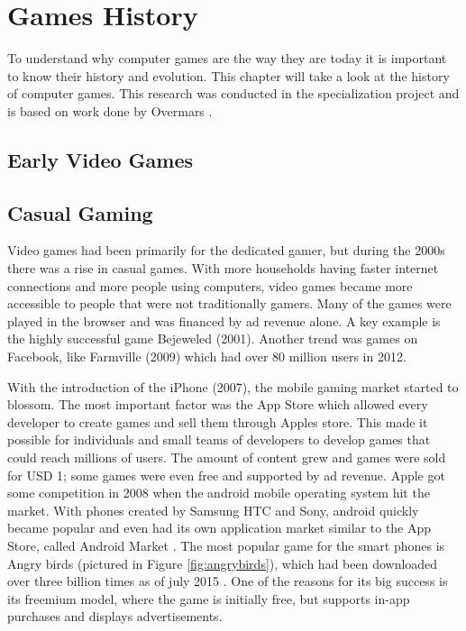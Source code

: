 \chapter{Games History}
\label{ch:gameshistory}
To understand why computer games are the way they are today it is important to know their history and evolution. This chapter will take a look at the history of computer games.
This research was conducted in the specialization project and is based on work done by Overmars \cite{overmars2012}.




\section{Early Video Games}

\section{Casual Gaming}
\label{sec:casualgaming}
Video games had been primarily for the dedicated gamer, but during the 2000s there was a rise in casual games. With more households having faster internet connections and more people using computers, video games became more accessible to people that were not traditionally gamers. Many of the games were played in the browser and was financed by ad revenue alone. A key example is the highly successful game Bejeweled (2001). Another trend was games on Facebook, like Farmville (2009) which had over 80 million users in 2012.

With the introduction of the iPhone (2007), the mobile gaming market started to blossom. The most important factor was the App Store which allowed every developer to create games and sell them through Apples store. This made it possible for individuals and small teams of developers to develop games that could reach millions of users. The amount of content grew and games were sold for USD 1; some games were even free and supported by ad revenue. Apple got some competition in 2008 when the android mobile operating system hit the market. With phones created by Samsung HTC and Sony, android quickly became popular and even had its own application market similar to the App Store, called Android Market \cite{2015android}. The most popular game for the smart phones is Angry birds (pictured in Figure \ref{fig:angrybirds}), which had been downloaded over three billion times as of july 2015 \cite{2015forbes}. One of the reasons for its big success is its freemium model, where the game is initially free, but supports in-app purchases and displays advertisements.

